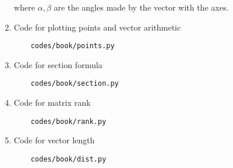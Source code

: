 \begin{enumerate}[label=\thesubsection.\arabic*.,ref=\thesubsection.\theenumi]
where ${ \alpha,  \beta }$ are the angles made by the vector with the axes.
\item Code for plotting points and vector arithmetic
	\begin{lstlisting}
	codes/book/points.py
\end{lstlisting}
\item Code for section formula 
	\begin{lstlisting}
	codes/book/section.py
\end{lstlisting}
\item Code for matrix rank
	\begin{lstlisting}
	codes/book/rank.py
\end{lstlisting}
\item Code for vector length
	\begin{lstlisting}
	codes/book/dist.py
\end{lstlisting}
\end{enumerate}
